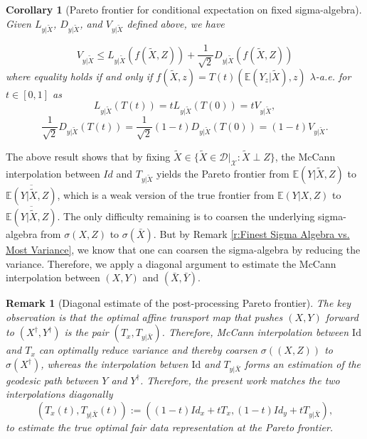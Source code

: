 \documentclass[twoside,11pt]{article}
\newtheorem{rema}{Remark}[section]{\bfseries}{\itshape}
\newtheorem{coro}{Corollary}[section]{\bfseries}{\itshape}
\begin{document}
\begin{coro}[Pareto frontier for conditional expectation on fixed sigma-algebra] \label{corr:pre pareto characterization}
Given $L_{y|\tilde{X}}$, $D_{y|\tilde{X}}$, and $V_{y|\tilde{X}}$ defined above, we have

\begin{equation}
V_{y|\tilde{X}} \leq L_{y|\tilde{X}}(f(\tilde{X},Z)) + \frac{1}{\sqrt{2}}D_{y|\tilde{X}}(f(\tilde{X},Z))
\end{equation}
where equality holds if and only if $f(\tilde{X},z) = T(t)(\mathbb{E}(Y_z|\tilde{X}),z)$ $\lambda$-a.e. for $t \in [0,1]$ as
\begin{equation}
L_{y|\tilde{X}}(T(t)) = tL_{y|\tilde{X}}(T(0)) = tV_{y|\tilde{X}},
\end{equation}
\begin{equation}
\frac{1}{\sqrt{2}}D_{y|\tilde{X}}(T(t)) = \frac{1}{\sqrt{2}}(1-t)D_{y|\tilde{X}}(T(0)) = (1-t)V_{y|\tilde{X}}.
\end{equation}

\end{coro}

The above result shows that by fixing $\tilde{X} \in \{ \tilde{X} \in \mathcal{D}|_{\mathcal{X}}: \tilde{X} \perp Z\}$, the McCann interpolation between $Id$ and $T_{y|\tilde{X}}$ yields the Pareto frontier from $\mathbb{E}(Y|\tilde{X},Z)$ to $\overline{\mathbb{E}(Y|\tilde{X},Z)}$, which is a weak version of the true frontier from $\mathbb{E}(Y|X,Z)$ to $\overline{\mathbb{E}(Y|\tilde{X},Z)}$. The only difficulty remaining is to coarsen the underlying sigma-algebra from $\sigma(X,Z)$ to $\sigma(\bar{X})$. But by Remark \ref{r:Finest Sigma Algebra vs. Most Variance}, we know that one can coarsen the sigma-algebra by reducing the variance. Therefore, we apply a diagonal argument to estimate the McCann interpolation between $(X,Y)$ and $(\bar{X},\bar{Y})$.

\begin{rema}[Diagonal estimate of the post-processing Pareto frontier] \label{r:Diagonal Estimate of the Post-processing Pareto Frontier}
The key observation is that the optimal affine transport map that pushes $(X,Y)$ forward to $(X^{\dag},Y^{\dag})$ is the pair $(T_x,T_{y|\bar{X}})$. Therefore, McCann interpolation between $\text{Id}$ and $T_x$ can optimally reduce variance and thereby coarsen $\sigma((X,Z))$ to $\sigma(X^{\dag})$, whereas the interpolation betwen $\text{Id}$ and $T_{y|\bar{X}}$ forms an estimation of the geodesic path between $Y$ and $Y^{\dag}$. Therefore, the present work matches the two interpolations diagonally $$(T_x(t), T_{y|\bar{X}}(t)) := ((1-t)Id_x + tT_x, (1-t)Id_y + tT_{y|\bar{X}}),$$ to estimate the true optimal fair data representation at the Pareto frontier.
\end{rema}
\end{document}
